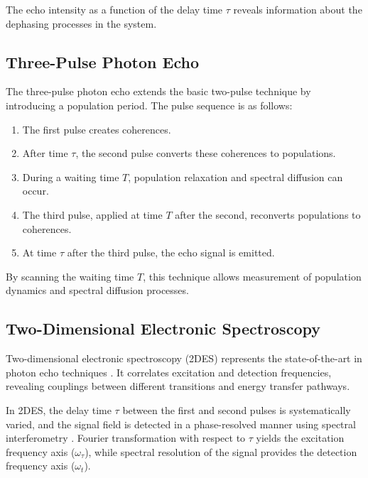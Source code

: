 \noindent The echo intensity as a function of the delay time $\tau$ reveals information about the dephasing processes in the system.

\subsection{Three-Pulse Photon Echo}
\label{subsec:three_pulse_echo}

\noindent The three-pulse photon echo extends the basic two-pulse technique by introducing a population period. The pulse sequence is as follows:

\begin{enumerate}
    \item The first pulse creates coherences.
    \item After time $\tau$, the second pulse converts these coherences to populations.
    \item During a waiting time $T$, population relaxation and spectral diffusion can occur.
    \item The third pulse, applied at time $T$ after the second, reconverts populations to coherences.
    \item At time $\tau$ after the third pulse, the echo signal is emitted.
\end{enumerate}

\noindent By scanning the waiting time $T$, this technique allows measurement of population dynamics and spectral diffusion processes.

\subsection{Two-Dimensional Electronic Spectroscopy}
\label{subsec:2d_spectroscopy}

\noindent Two-dimensional electronic spectroscopy (2DES) represents the state-of-the-art in photon echo techniques \cite{Jonas2003, Brixner2005, Schlau-Cohen2011}. It correlates excitation and detection frequencies, revealing couplings between different transitions and energy transfer pathways.

\noindent In 2DES, the delay time $\tau$ between the first and second pulses is systematically varied, and the signal field is detected in a phase-resolved manner using spectral interferometry \cite{Lepetit1995, Bristow2011}. Fourier transformation with respect to $\tau$ yields the excitation frequency axis ($\omega_\tau$), while spectral resolution of the signal provides the detection frequency axis ($\omega_t$).

